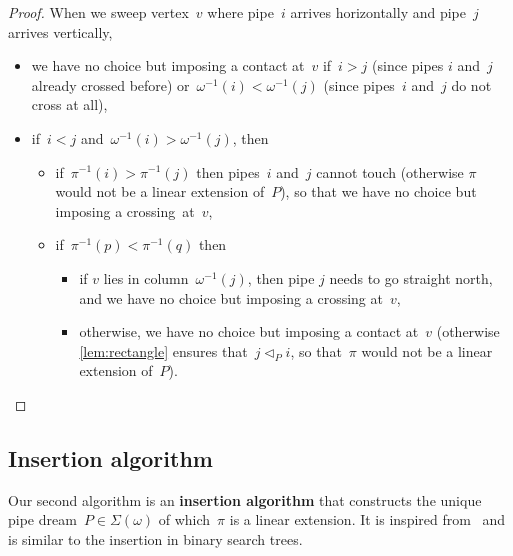 \documentclass{amsart}
\theoremstyle{definition}
\newcommand{\defn}[1]{\textbf{\textsf{\color{PineGreen} #1}}} %
\newcommand{\acyclicPipeDreams}{\Sigma} %
\newcommand{\less}{\vartriangleleft} %
\newcommand{\contactLess}[1]{\less_{#1}} %
\begin{document}
\begin{proof}
When we sweep vertex~$v$ where pipe~$i$ arrives horizontally and pipe~$j$ arrives vertically,
\begin{itemize}
\item we have no choice but imposing a contact at~$v$ if~$i > j$ (since pipes $i$ and~$j$ already crossed before) or~$\omega^{-1}(i) < \omega^{-1}(j)$ (since pipes~$i$ and~$j$ do not cross at all),
\item if~$i < j$ and~$\omega^{-1}(i) > \omega^{-1}(j)$, then
\begin{itemize}
\item if~$\pi^{-1}(i) > \pi^{-1}(j)$ then pipes~$i$ and~$j$ cannot touch (otherwise $\pi$ would not be a linear extension of~$P$), so that we have no choice but imposing a crossing~at~$v$,
\item if~$\pi^{-1}(p) < \pi^{-1}(q)$ then
	\begin{itemize}
	\item if $v$ lies in column~$\omega^{-1}(j)$, then pipe $j$ needs to go straight north, and we have no choice but imposing a crossing at~$v$,
	\item otherwise, we have no choice but imposing a contact at~$v$ (otherwise \cref{lem:rectangle} ensures that~$j \contactLess{P} i$, so that~$\pi$ would not be a linear extension of~$P$).
	\qedhere
	\end{itemize}
\end{itemize}
\end{itemize}
\end{proof}


\subsection{Insertion algorithm}
\label{subsec:insertionAlgorithm}

Our second algorithm is an \defn{insertion algorithm} that constructs the unique pipe dream~$P \in \acyclicPipeDreams(\omega)$ of which~$\pi$ is a linear extension.
It is inspired from~\cite{Pilaud-BrickAlgebra} and is similar to the insertion in binary search trees.
\end{document}
